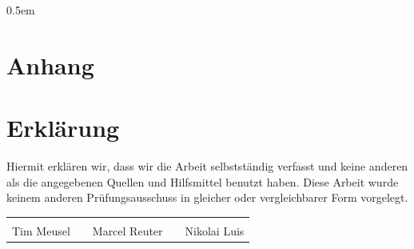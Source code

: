 
\printglossaries%

\begingroup
{}
\emergencystretch 0.5em
\printbibliography[heading=bibnumbered]
\endgroup

\chapter{Anhang}


\FloatBarrier%

\FloatBarrier%


\chapter{Erklärung}
Hiermit erklären wir, dass wir die Arbeit selbstständig verfasst und keine
anderen als die angegebenen Quellen und Hilfsmittel benutzt haben. Diese Arbeit
wurde keinem anderen Prüfungsausschuss in gleicher oder vergleichbarer Form
vorgelegt.

\vspace{10ex}
{\centering
\renewcommand{\arraystretch}{0.9}
\begin{tabular}{p{}p{}p{}p{}p{}}
  \dotfill                    & & \dotfill                      & & \dotfill \\
  \centering\footnotesize{Tim Meusel}& & \centering\footnotesize{Marcel Reuter}& & \centering\footnotesize{Nikolai Luis}%
\end{tabular}
}

